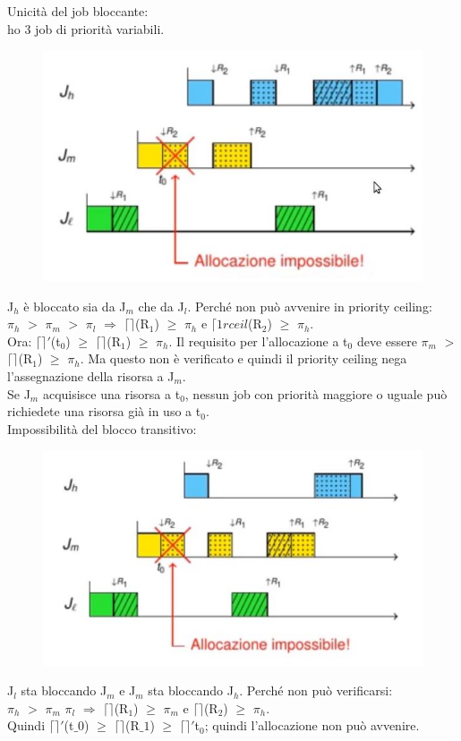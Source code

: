 \documentclass[12pt, oneside]{extbook}
\begin{document}
Unicità del job bloccante:\\ ho 3 job di priorità variabili.
\begin{figure}[!h]
\centering
\includegraphics[scale=0.4]{immagini/image-026.jpg}
\end{figure}
J$_{h}$ è bloccato sia da J$_{m}$ che da J$_{l}$. Perché non può avvenire in priority ceiling:\\ $\pi_{h}$ $>$ $\pi_{m}$ $>$ $\pi_{l}$ $\Rightarrow$ $\lceil\rceil$(R$_{1}$) $\geq$ $\pi_{h}$ e $\lceil1rceil$(R$_{2}$) $\geq$ $\pi_{h}$.\\ Ora: $\lceil\rceil'$(t$_{0}$) $\geq$ $\lceil\rceil$(R$_{1}$) $\geq$ $\pi_{h}$. Il requisito per l'allocazione a t$_{0}$ deve essere $\pi_{m}$ $>$ $\lceil\rceil$(R$_{1}$) $\geq$ $\pi_{h}$. Ma questo non è verificato e quindi il priority ceiling nega l'assegnazione della risorsa a J$_{m}$.\\ Se J$_{m}$ acquisisce una risorsa a t$_{0}$, nessun job con priorità maggiore o uguale può richiedete una risorsa già in uso a t$_{0}$.\\ Impossibilità del blocco transitivo:\\
\begin{figure}[!h]
\centering
\includegraphics[scale=0.4]{immagini/image-027.jpg}
\end{figure}
J$_{l}$ sta bloccando J$_{m}$ e J$_{m}$ sta bloccando J$_{h}$. Perché non può verificarsi:\\ $\pi_{h}$ $>$ $\pi_{m}$ $\pi_{l}$ $\Rightarrow$ $\lceil\rceil$(R$_{1}$) $\geq$ $\pi_{m}$ e $\lceil\rceil$(R$_{2}$) $\geq$ $\pi_{h}$.\\ Quindi $\lceil\rceil'$(t$\_{0}$) $\geq$ $\lceil\rceil$(R$\_{1}$) $\geq$ $\lceil\rceil'$t$_{0}$; quindi l'allocazione non può avvenire.\\
\end{document}
